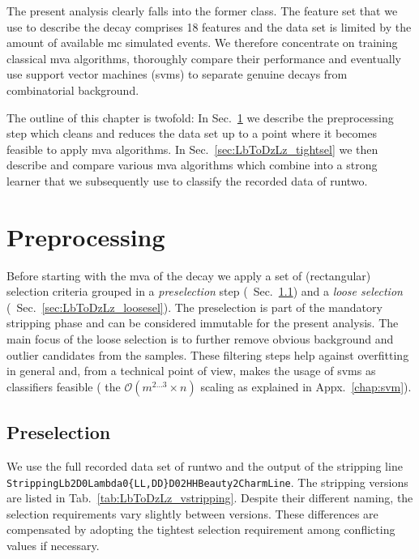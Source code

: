 The present analysis clearly falls into the former class.
The feature set that we use to describe the decay \decay{\Lb}{\Dz\Lz} comprises 18 features and the data set is limited by the amount of available \gls{mc} simulated events.
We therefore concentrate on training classical \gls{mva} algorithms, thoroughly compare their performance and eventually use support vector machines (\glspl{svm}) to separate genuine \decay{\Lb}{\Dz\Lz} decays from combinatorial background.

The outline of this chapter is twofold: In Sec.~\ref{sec:LbToDzLz_prepro} we describe the preprocessing step which cleans and reduces the data set up to a point where it becomes feasible to apply \gls{mva} algorithms.
In Sec.~\ref{sec:LbToDzLz_tightsel} we then describe and compare various \gls{mva} algorithms which combine into a strong learner that we subsequently use to classify the recorded data of \gls{runtwo}.

\section{Preprocessing}
\label{sec:LbToDzLz_prepro}
Before starting with the \gls{mva} of the decay \decay{\Lb}{\Dz\Lz} we apply a set of (rectangular) selection criteria grouped in a \textit{preselection} step (\cf{}~Sec.~\ref{sec:LbToDzLz_presel}) and a \textit{loose selection} (\cf{}~Sec.~\ref{sec:LbToDzLz_loosesel}).
The preselection is part of the mandatory \gls{stripping} phase and can be considered immutable for the present analysis.
The main focus of the loose selection is to further remove obvious background and outlier candidates from the samples.
These filtering steps help against overfitting in general and, from a technical point of view, makes the usage of \glspl{svm} as classifiers feasible (\cf{} the $\mathcal{O}(m^{2 \ldots 3} \times n)$ scaling as explained in Appx.~\ref{chap:svm}).

\subsection{Preselection}
\label{sec:LbToDzLz_presel}
We use the full recorded data set of \gls{runtwo} and the output of the \gls{stripping} line \texttt{Stripping\-Lb2D0Lambda0\-\{LL,DD\}\-D02HH\-Beauty2Charm\-Line}.
The \gls{stripping} versions are listed in Tab.~\ref{tab:LbToDzLz_vstripping}.
Despite their different naming, the selection requirements vary slightly between versions.
These differences are compensated by adopting the tightest selection requirement among conflicting values if necessary.


